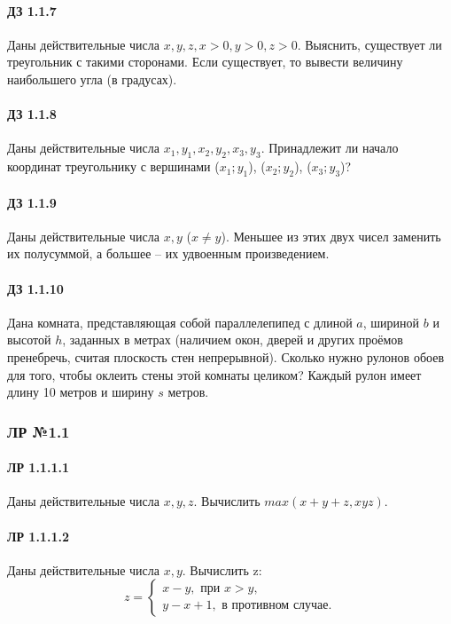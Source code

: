 \documentclass[12pt,a4paper]{report}
\begin{document}
\paragraph*{ДЗ 1.1.7} Даны действительные числа $x, y, z, x > 0, y > 0, z > 0$. Выяснить, существует ли треугольник с такими сторонами. Если существует, то вывести величину наибольшего угла (в градусах).
\paragraph*{ДЗ 1.1.8} Даны действительные числа $x_1, y_1, x_2, y_2, x_3, y_3$. Принадлежит ли начало координат треугольнику с вершинами ($x_1;y_1$), ($x_2;y_2$), ($x_3;y_3$)?
\paragraph*{ДЗ 1.1.9} Даны действительные числа $x, y$ ($x \neq y$). Меньшее из этих двух чисел заменить их полусуммой, а большее -- их удвоенным произведением. 
\paragraph*{ДЗ 1.1.10} Дана комната, представляющая собой параллелепипед с длиной $a$, шириной $b$ и высотой $h$, заданных в метрах (наличием окон, дверей и других проёмов пренебречь, считая плоскость стен непрерывной). Сколько нужно рулонов обоев для того, чтобы оклеить стены этой комнаты целиком? Каждый рулон имеет длину 10 метров и ширину $s$ метров.


\clearpage
\subsubsection*{ЛР №1.1}
\paragraph*{ЛР 1.1.1.1} Даны действительные числа $x, y, z$. Вычислить $max(x+y+z, xyz)$.
\paragraph*{ЛР 1.1.1.2} Даны действительные числа $x, y$. Вычислить z:
\begin{equation*}
 z = 
 \begin{cases}
   x - y, \text{ при } x > y, \\
   y - x + 1, \text{ в противном случае}.
 \end{cases}
\end{equation*}
\end{document}
